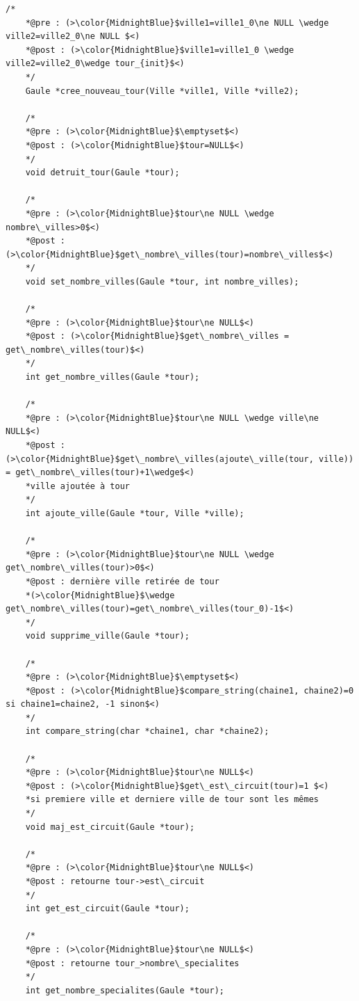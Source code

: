 \documentclass[a4paper, 11pt, oneside]{article}
\begin{document}
\begin{lstlisting}[caption = {Spécification des fonctions et procédures du header "gaule.h"}]
    /*
    *@pre : (>\color{MidnightBlue}$ville1=ville1_0\ne NULL \wedge ville2=ville2_0\ne NULL $<)
    *@post : (>\color{MidnightBlue}$ville1=ville1_0 \wedge ville2=ville2_0\wedge tour_{init}$<)
    */
    Gaule *cree_nouveau_tour(Ville *ville1, Ville *ville2);

    /*
    *@pre : (>\color{MidnightBlue}$\emptyset$<)
    *@post : (>\color{MidnightBlue}$tour=NULL$<)
    */
    void detruit_tour(Gaule *tour);

    /*
    *@pre : (>\color{MidnightBlue}$tour\ne NULL \wedge nombre\_villes>0$<)
    *@post : (>\color{MidnightBlue}$get\_nombre\_villes(tour)=nombre\_villes$<)
    */
    void set_nombre_villes(Gaule *tour, int nombre_villes);

    /*
    *@pre : (>\color{MidnightBlue}$tour\ne NULL$<)
    *@post : (>\color{MidnightBlue}$get\_nombre\_villes = get\_nombre\_villes(tour)$<)
    */
    int get_nombre_villes(Gaule *tour);

    /*
    *@pre : (>\color{MidnightBlue}$tour\ne NULL \wedge ville\ne NULL$<)
    *@post : (>\color{MidnightBlue}$get\_nombre\_villes(ajoute\_ville(tour, ville)) = get\_nombre\_villes(tour)+1\wedge$<)
    *ville ajoutée à tour
    */
    int ajoute_ville(Gaule *tour, Ville *ville);

    /*
    *@pre : (>\color{MidnightBlue}$tour\ne NULL \wedge get\_nombre\_villes(tour)>0$<)
    *@post : dernière ville retirée de tour 
    *(>\color{MidnightBlue}$\wedge get\_nombre\_villes(tour)=get\_nombre\_villes(tour_0)-1$<)
    */
    void supprime_ville(Gaule *tour);

    /*
    *@pre : (>\color{MidnightBlue}$\emptyset$<)
    *@post : (>\color{MidnightBlue}$compare_string(chaine1, chaine2)=0 si chaine1=chaine2, -1 sinon$<)
    */
    int compare_string(char *chaine1, char *chaine2);

    /*
    *@pre : (>\color{MidnightBlue}$tour\ne NULL$<)
    *@post : (>\color{MidnightBlue}$get\_est\_circuit(tour)=1 $<)
    *si premiere ville et derniere ville de tour sont les mêmes
    */
    void maj_est_circuit(Gaule *tour);

    /*
    *@pre : (>\color{MidnightBlue}$tour\ne NULL$<)
    *@post : retourne tour->est\_circuit
    */
    int get_est_circuit(Gaule *tour);

    /*
    *@pre : (>\color{MidnightBlue}$tour\ne NULL$<)
    *@post : retourne tour_>nombre\_specialites
    */
    int get_nombre_specialites(Gaule *tour);


\end{lstlisting}
\end{document}
